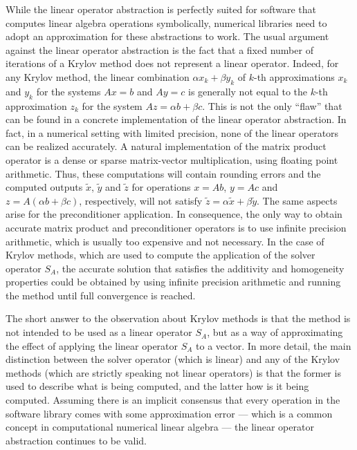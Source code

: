 While the linear operator abstraction is perfectly suited for software that
computes linear algebra operations symbolically, numerical libraries need to
adopt an approximation for these abstractions to work. The usual
argument against the linear operator abstraction is the fact that a fixed number
of iterations of a Krylov method does not represent a linear operator. Indeed,
for any Krylov method, the linear combination $\alpha x_k + \beta y_k$ of $k$-th
approximations $x_k$ and $y_k$ for the systems $Ax = b$ and $Ay = c$ is
generally not equal to the $k$-th approximation $z_k$ for the system $Az =
\alpha b + \beta c$. This is not the only ``flaw'' that can be found in a
concrete implementation of the linear operator abstraction.  In fact, in a
numerical setting with limited precision, none of the linear operators can be
realized accurately.
A natural implementation of the matrix product operator is
a dense or sparse matrix-vector
multiplication, using floating point arithmetic. Thus, these computations will
contain rounding errors and the computed outputs $\widetilde{x}$,
$\widetilde{y}$ and $\widetilde{z}$ for operations $x = Ab$, $y = Ac$ and $z =
A(\alpha b + \beta c)$, respectively, will not satisfy $\widetilde{z} = \alpha
\widetilde{x} + \beta \widetilde{y}$.  The same aspects arise for the
preconditioner application. In consequence, the only way to obtain accurate
matrix product and preconditioner operators is to use infinite precision
arithmetic, which is usually too expensive and not necessary. In the case of
Krylov methods, which are used to compute the application of the solver operator
$S_A$, the accurate solution that satisfies the additivity and homogeneity
properties could be obtained by using infinite precision arithmetic and running
the method until full convergence is reached.

The short answer to the observation about Krylov methods is that the method is
not intended to be used as a linear operator $S_A$, but as a way of
approximating the effect of applying the linear operator $S_A$ to a vector.
In more detail, the main distinction between the solver operator (which is
linear) and any of the Krylov methods (which are strictly speaking not
linear operators) is that the former is used to describe what is being
computed, and the latter how is it being computed.
Assuming there is an implicit consensus that every operation in the software
library comes with some approximation error --- which is a common concept in
computational numerical linear algebra --- the linear operator abstraction
continues to be valid.


